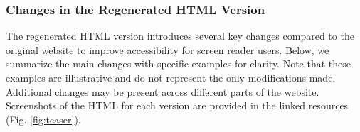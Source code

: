 



\subsubsection{Changes in the Regenerated HTML Version}


The regenerated HTML version introduces several key changes compared to the original website to improve accessibility for screen reader users. Below, we summarize the main changes with specific examples for clarity. Note that these examples are illustrative and do not represent the only modifications made. Additional changes may be present across different parts of the website. Screenshots of the HTML for each version are provided in the linked resources (Fig. \ref{fig:teaser}).

